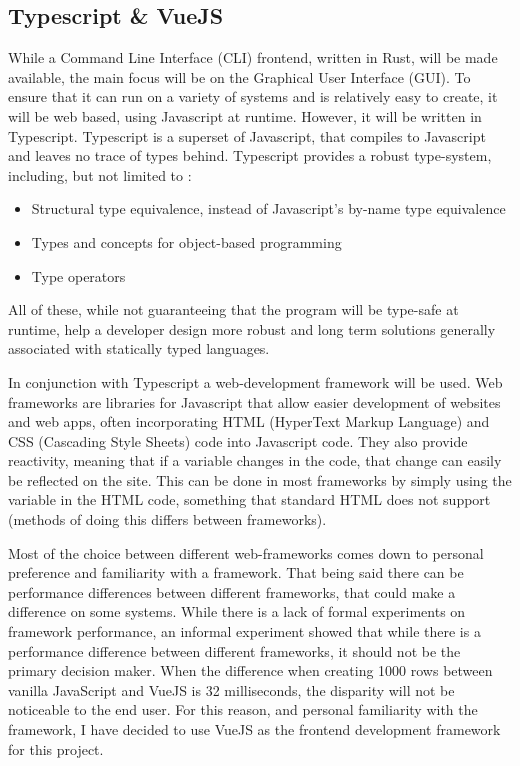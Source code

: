 \subsection{Typescript \& VueJS} \label{sec:chapdesign:technology:ts}
While a Command Line Interface (CLI) frontend, written in Rust, will be made available, the main focus will be on the Graphical User Interface (GUI). To ensure that it can run on a variety of systems and is relatively easy to create, it will be web based, using Javascript at runtime. However, it will be written in Typescript. Typescript is a superset of Javascript, that compiles to Javascript and leaves no trace of types behind. Typescript provides a robust type-system, including, but not limited to \cite{understandingTypescript}:
\begin{itemize}
    \item Structural type equivalence, instead of Javascript's by-name type equivalence
    \item Types and concepts for object-based programming
    \item Type operators
\end{itemize}
All of these, while not guaranteeing that the program will be type-safe at runtime, help a developer design more robust and long term solutions generally associated with statically typed languages.

In conjunction with Typescript a web-development framework will be used. Web frameworks are libraries for Javascript that allow easier development of websites and web apps, often incorporating HTML (HyperText Markup Language) and CSS (Cascading Style Sheets) code into Javascript code. They also provide reactivity, meaning that if a variable changes in the code, that change can easily be reflected on the site. This can be done in most frameworks by simply using the variable in the HTML code, something that standard HTML does not support (methods of doing this differs between frameworks).

Most of the choice between different web-frameworks comes down to personal preference and familiarity with a framework. That being said there can be performance differences between different frameworks, that could make a difference on some systems. While there is a lack of formal experiments on framework performance, an informal experiment \cite{performanceComparisonJS} showed that while there is a performance difference between different frameworks, it should not be the primary decision maker. When the difference when creating 1000 rows between vanilla JavaScript and VueJS is 32 milliseconds, the disparity will not be noticeable to the end user. For this reason, and personal familiarity with the framework, I have decided to use VueJS as the frontend development framework for this project.

